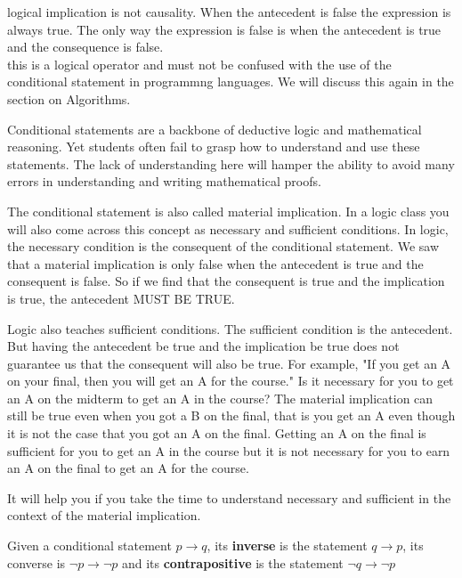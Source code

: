 \begin{notes}
logical implication is not causality. When the antecedent is false the expression is always true. The only way the expression is false is when the antecedent is true and the consequence is false. \\

this is a logical operator and must not be confused with the use of the conditional statement in programmng languages. We will discuss this again in the section on Algorithms.

Conditional statements are a backbone of deductive logic and mathematical reasoning. Yet students often fail to grasp how to understand and use these statements. The lack of understanding here will hamper the ability to avoid many errors in understanding and writing mathematical proofs. 

The conditional statement is also called material implication. In a logic class you will also come across this concept as necessary and sufficient conditions. In logic, the necessary condition is the consequent of the conditional statement. We saw that a material implication is only false when the antecedent is true and the consequent is false. So if we find that the consequent is true and the implication is true, the antecedent MUST BE TRUE. 

Logic also teaches sufficient conditions. The sufficient condition is the antecedent. But having the antecedent be true and the implication be true does not guarantee us that the consequent will also be true. For example, "If you get an A on your final, then you will get an A for the course." Is it necessary for you to get an A on the midterm to get an A in the course? The material implication can still be true even when you got a B on the final, that is you get an A even though it is not the case that you got an A on the final. Getting an A on the final is sufficient for you to get an A in the course but it is not necessary for you to earn an A on the final to get an A for the course.

It will help you if you take the time to understand necessary and sufficient in the context of the material implication.
\end{notes}



\begin {definition} 
Given a conditional statement $p \rightarrow q$, its \textbf{inverse} is the statement $q \rightarrow p$, its converse is $\lnot p \rightarrow \lnot p$ and its \textbf{contrapositive} is the statement $\lnot q \rightarrow \lnot p $
\end {definition}
 
